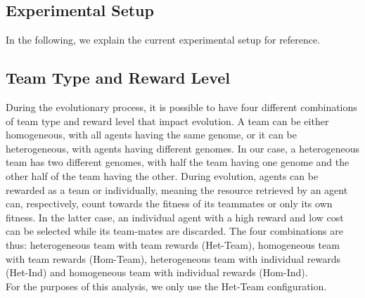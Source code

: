 \documentclass[12pt]{article}
\begin{document}
\begin{appendices}

\section{Experimental Setup}\label{experimental_setup}

In the following, we explain the current experimental setup for reference.

\subsection{Team Type and Reward Level}\label{rewards}

During the evolutionary process, it is possible to have four different combinations of team type and reward level that impact evolution.
A team can be either homogeneous, with all agents having the same genome, or it can be heterogeneous, with agents having different genomes.
In our case, a heterogeneous team has two different genomes, with half the team having one genome and the other half of the team having the other.
During evolution, agents can be rewarded as a team or individually, meaning the resource retrieved by an agent can, respectively, count towards the fitness of its teammates or only its own fitness.
In the latter case, an individual agent with a high reward and low cost can be selected while its team-mates are discarded. 
The four combinations are thus: heterogeneous team with team rewards (Het-Team), homogeneous team with team rewards (Hom-Team), heterogeneous team with individual rewards (Het-Ind) and homogeneous team with individual rewards (Hom-Ind).\\

For the purposes of this analysis, we only use the Het-Team configuration.

\end{appendices}
\end{document}

